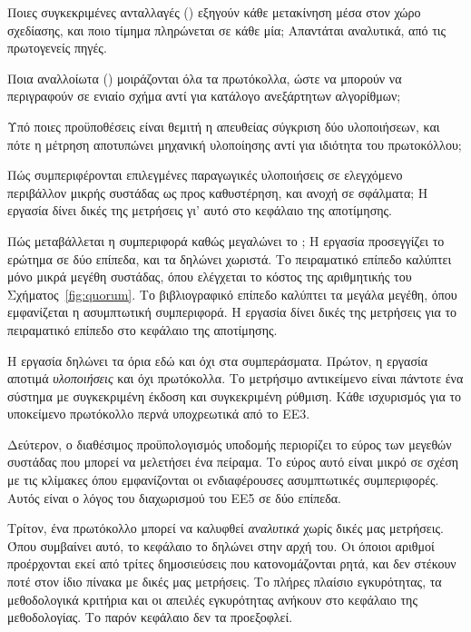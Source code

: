 \begin{description}[leftmargin=2.1em,style=nextline,font=\normalfont\bfseries]
  \item[ΕΕ1 --- Εξέλιξη.] Ποιες συγκεκριμένες ανταλλαγές ()
  εξηγούν κάθε μετακίνηση μέσα στον χώρο σχεδίασης, και ποιο τίμημα
  πληρώνεται σε κάθε μία; Απαντάται αναλυτικά, από τις πρωτογενείς πηγές.
  \item[ΕΕ2 --- Κοινή δομή.] Ποια αναλλοίωτα () μοιράζονται
  όλα τα πρωτόκολλα, ώστε να μπορούν να περιγραφούν σε ενιαίο σχήμα αντί
  για κατάλογο ανεξάρτητων αλγορίθμων;
  \item[ΕΕ3 --- Συγκρισιμότητα.] Υπό ποιες προϋποθέσεις είναι θεμιτή η
  απευθείας σύγκριση δύο υλοποιήσεων, και πότε η μέτρηση αποτυπώνει
  μηχανική υλοποίησης αντί για ιδιότητα του πρωτοκόλλου;
  \item[ΕΕ4 --- Εμπειρική συμπεριφορά.] Πώς συμπεριφέρονται επιλεγμένες
  παραγωγικές υλοποιήσεις σε ελεγχόμενο περιβάλλον μικρής συστάδας ως
  προς καθυστέρηση,  και ανοχή σε σφάλματα; Η εργασία
  δίνει δικές της μετρήσεις γι' αυτό στο κεφάλαιο της αποτίμησης.
  \item[ΕΕ5 --- Κλιμάκωση.] Πώς μεταβάλλεται η συμπεριφορά καθώς μεγαλώνει
  το ; Η εργασία προσεγγίζει το ερώτημα σε δύο επίπεδα, και τα
  δηλώνει χωριστά. Το πειραματικό επίπεδο καλύπτει μόνο μικρά μεγέθη
  συστάδας, όπου ελέγχεται το κόστος της αριθμητικής του
  Σχήματος~\ref{fig:quorum}. Το βιβλιογραφικό επίπεδο καλύπτει τα μεγάλα
  μεγέθη, όπου εμφανίζεται η ασυμπτωτική συμπεριφορά. Η εργασία δίνει
  δικές της μετρήσεις για το πειραματικό επίπεδο στο κεφάλαιο της
  αποτίμησης.
\end{description}

Η εργασία δηλώνει τα όρια εδώ και όχι στα συμπεράσματα. Πρώτον, η εργασία
αποτιμά \emph{υλοποιήσεις} και όχι πρωτόκολλα. Το μετρήσιμο αντικείμενο
είναι πάντοτε ένα σύστημα με συγκεκριμένη έκδοση και συγκεκριμένη
ρύθμιση. Κάθε ισχυρισμός για το υποκείμενο πρωτόκολλο περνά υποχρεωτικά
από το ΕΕ3.

Δεύτερον, ο διαθέσιμος προϋπολογισμός υποδομής περιορίζει το εύρος των
μεγεθών συστάδας που μπορεί να μελετήσει ένα πείραμα. Το εύρος αυτό είναι
μικρό σε σχέση με τις κλίμακες όπου εμφανίζονται οι ενδιαφέρουσες
ασυμπτωτικές συμπεριφορές. Αυτός είναι ο λόγος του διαχωρισμού του ΕΕ5 σε
δύο επίπεδα.

Τρίτον, ένα πρωτόκολλο μπορεί να καλυφθεί \emph{αναλυτικά} χωρίς δικές
μας μετρήσεις. Όπου συμβαίνει αυτό, το κεφάλαιο το δηλώνει στην αρχή
του. Οι όποιοι αριθμοί προέρχονται εκεί από τρίτες δημοσιεύσεις που
κατονομάζονται ρητά, και δεν στέκουν ποτέ στον ίδιο πίνακα με δικές μας
μετρήσεις. Το πλήρες πλαίσιο εγκυρότητας, τα μεθοδολογικά κριτήρια και οι
απειλές εγκυρότητας ανήκουν στο κεφάλαιο της μεθοδολογίας. Το παρόν
κεφάλαιο δεν τα προεξοφλεί.

